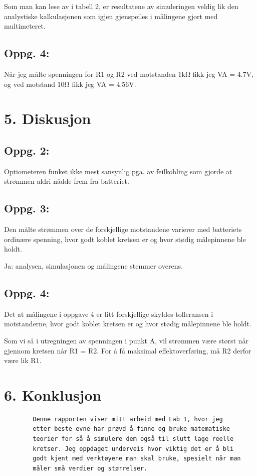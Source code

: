 \documentclass{article}
\begin{document}
        Som man kan lese av i tabell 2, er resultatene av simuleringen veldig lik den analystiske 
        kalkulasjonen som igjen gjenspeiles i målingene gjort med multimeteret.

        \subsection*{Oppg. 4:}
        Når jeg målte spenningen for R1 og R2 ved motstanden 1kΩ fikk jeg VA = 4.7V, og ved 
        motstand 10Ω fikk jeg VA = 4.56V.

    \section*{5. Diskusjon}
        \subsection*{Oppg. 2:}
        Optiometeren funket ikke mest sansynlig pga. av feilkobling som gjorde at strømmen aldri nådde 
        frem fra batteriet.

        \subsection*{Oppg. 3:}
        Den målte strømmen over de forskjellige motstandene varierer med batteriets ordinære spenning, 
        hvor godt koblet kretsen er og hvor stødig målepinnene ble holdt. \linebreak

        Ja: analysen, simulasjonen og målingene stemmer overens.

        \subsection*{Oppg. 4:}
        Det at målingene i oppgave 4 er litt forskjellige skyldes tolleransen i motstanderne, hvor 
        godt koblet kretsen er og hvor stødig målepinnene ble holdt. \linebreak

        Som vi så i utregningen av spenningen i punkt A, vil strømmen være størst når gjennom 
        kretsen når R1 = R2. For å få maksimal effektoverføring, må R2 derfor være lik R1.
    \section*{6. Konklusjon}
        \begin{verbatim}
        Denne rapporten viser mitt arbeid med Lab 1, hvor jeg 
        etter beste evne har prøvd å finne og bruke matematiske 
        teorier for så å simulere dem også til slutt lage reelle 
        kretser. Jeg oppdaget underveis hvor viktig det er å bli 
        godt kjent med verktøyene man skal bruke, spesielt når man 
        måler små verdier og størrelser.
    \end{verbatim}
\end{document}
